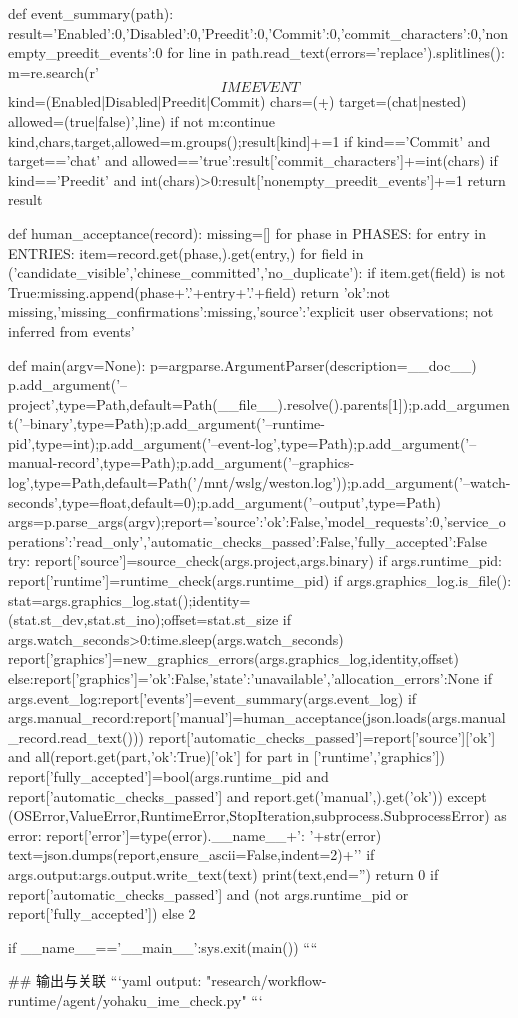 def event_summary(path):
    result={'Enabled':0,'Disabled':0,'Preedit':0,'Commit':0,'commit_characters':0,'nonempty_preedit_events':0}
    for line in path.read_text(errors='replace').splitlines():
        m=re.search(r'\[IME EVENT\] kind=(Enabled|Disabled|Preedit|Commit) chars=(\d+) target=(chat|nested) allowed=(true|false)',line)
        if not m:continue
        kind,chars,target,allowed=m.groups();result[kind]+=1
        if kind=='Commit' and target=='chat' and allowed=='true':result['commit_characters']+=int(chars)
        if kind=='Preedit' and int(chars)>0:result['nonempty_preedit_events']+=1
    return result

def human_acceptance(record):
    missing=[]
    for phase in PHASES:
        for entry in ENTRIES:
            item=record.get(phase,{}).get(entry,{})
            for field in ('candidate_visible','chinese_committed','no_duplicate'):
                if item.get(field) is not True:missing.append(phase+'.'+entry+'.'+field)
    return {'ok':not missing,'missing_confirmations':missing,'source':'explicit user observations; not inferred from events'}

def main(argv=None):
    p=argparse.ArgumentParser(description=__doc__)
    p.add_argument('--project',type=Path,default=Path(__file__).resolve().parents[1]);p.add_argument('--binary',type=Path);p.add_argument('--runtime-pid',type=int);p.add_argument('--event-log',type=Path);p.add_argument('--manual-record',type=Path);p.add_argument('--graphics-log',type=Path,default=Path('/mnt/wslg/weston.log'));p.add_argument('--watch-seconds',type=float,default=0);p.add_argument('--output',type=Path)
    args=p.parse_args(argv);report={'source':{'ok':False},'model_requests':0,'service_operations':'read_only','automatic_checks_passed':False,'fully_accepted':False}
    try:
        report['source']=source_check(args.project,args.binary)
        if args.runtime_pid:
            report['runtime']=runtime_check(args.runtime_pid)
            if args.graphics_log.is_file():
                stat=args.graphics_log.stat();identity=(stat.st_dev,stat.st_ino);offset=stat.st_size
                if args.watch_seconds>0:time.sleep(args.watch_seconds)
                report['graphics']=new_graphics_errors(args.graphics_log,identity,offset)
            else:report['graphics']={'ok':False,'state':'unavailable','allocation_errors':None}
        if args.event_log:report['events']=event_summary(args.event_log)
        if args.manual_record:report['manual']=human_acceptance(json.loads(args.manual_record.read_text()))
        report['automatic_checks_passed']=report['source']['ok'] and all(report.get(part,{'ok':True})['ok'] for part in ['runtime','graphics'])
        report['fully_accepted']=bool(args.runtime_pid and report['automatic_checks_passed'] and report.get('manual',{}).get('ok'))
    except (OSError,ValueError,RuntimeError,StopIteration,subprocess.SubprocessError) as error:
        report['error']=type(error).__name__+': '+str(error)
    text=json.dumps(report,ensure_ascii=False,indent=2)+'\n'
    if args.output:args.output.write_text(text)
    print(text,end='')
    return 0 if report['automatic_checks_passed'] and (not args.runtime_pid or report['fully_accepted']) else 2

if __name__=='__main__':sys.exit(main())
````

## 输出与关联
```yaml
output: "research/workflow-runtime/agent/yohaku_ime_check.py"
```
